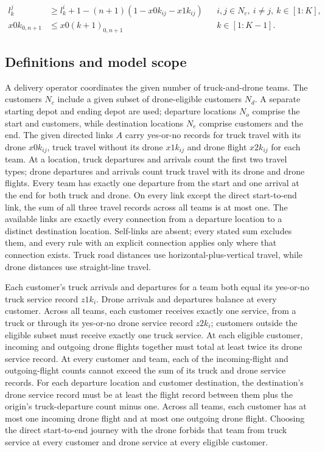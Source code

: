 \documentclass[10pt]{article}
\begin{document}
\begin{align*}
 l_k^j&\ge l_k^i+1-(n+1)(1-x0k_{ij}-x1k_{ij})
 &&i,j\in N_c,\ i\ne j,\ k\in[1:K],\\
 x0k_{0,n+1}&\le x0(k+1)_{0,n+1} && k\in[1:K-1].
\end{align*}

\subsection*{Definitions and model scope}
A delivery operator coordinates the given number of truck-and-drone teams. The customers $N_c$ include a given subset of drone-eligible customers $N_d$. A separate starting depot and ending depot are used; departure locations $N_o$ comprise the start and customers, while destination locations $N_e$ comprise customers and the end. The given directed links $A$ carry yes-or-no records for truck travel with its drone $x0k_{ij}$, truck travel without its drone $x1k_{ij}$ and drone flight $x2k_{ij}$ for each team. At a location, truck departures and arrivals count the first two travel types; drone departures and arrivals count truck travel with its drone and drone flights. Every team has exactly one departure from the start and one arrival at the end for both truck and drone. On every link except the direct start-to-end link, the sum of all three travel records across all teams is at most one. The available links are exactly every connection from a departure location to a distinct destination location. Self-links are absent; every stated sum excludes them, and every rule with an explicit connection applies only where that connection exists. Truck road distances use horizontal-plus-vertical travel, while drone distances use straight-line travel.

Each customer's truck arrivals and departures for a team both equal its yes-or-no truck service record $z1k_i$. Drone arrivals and departures balance at every customer. Across all teams, each customer receives exactly one service, from a truck or through its yes-or-no drone service record $z2k_i$; customers outside the eligible subset must receive exactly one truck service. At each eligible customer, incoming and outgoing drone flights together must total at least twice its drone service record. At every customer and team, each of the incoming-flight and outgoing-flight counts cannot exceed the sum of its truck and drone service records. For each departure location and customer destination, the destination's drone service record must be at least the flight record between them plus the origin's truck-departure count minus one. Across all teams, each customer has at most one incoming drone flight and at most one outgoing drone flight. Choosing the direct start-to-end journey with the drone forbids that team from truck service at every customer and drone service at every eligible customer.
\end{document}
